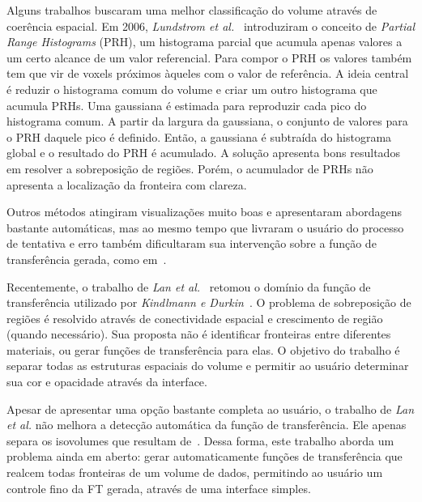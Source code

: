 	Alguns trabalhos buscaram uma melhor classificação do volume através de coerência espacial. Em 2006, \textit{Lundstrom et al.}~\cite{lundstrom1} introduziram o conceito de \textit{Partial Range Histograms} (PRH), um histograma parcial que acumula apenas valores a um certo alcance de um valor referencial. Para compor o PRH os valores também tem que vir de voxels próximos àqueles com o valor de referência. A ideia central é reduzir o histograma comum do volume e criar um outro histograma que acumula PRHs. Uma gaussiana é estimada para reproduzir cada pico do histograma comum. A partir da largura da gaussiana, o conjunto de valores para o PRH daquele pico é definido. Então, a gaussiana é subtraída do histograma global e o resultado do PRH é acumulado. A solução apresenta bons resultados em resolver a sobreposição de regiões. Porém, o acumulador de PRHs não apresenta a localização da fronteira com clareza.
	
	Outros métodos atingiram visualizações muito boas e apresentaram abordagens bastante automáticas, mas ao mesmo tempo que livraram o usuário do processo de tentativa e erro também dificultaram sua intervenção sobre a função de transferência gerada, como em~\cite{ruiz, zhou}.
	
	Recentemente, o trabalho de \textit{Lan et al.}~\cite{lan} retomou o domínio da função de transferência utilizado por \textit{Kindlmann e Durkin}~\cite{gordon}. O problema de sobreposição de regiões é resolvido através de conectividade espacial e crescimento de região (quando necessário). Sua proposta não é identificar fronteiras entre diferentes materiais, ou gerar funções de transferência para elas. O objetivo do trabalho é separar todas as estruturas espaciais do volume e permitir ao usuário determinar sua cor e opacidade através da interface. 
	
	Apesar de apresentar uma opção bastante completa ao usuário, o trabalho de \textit{Lan et al.} não melhora a detecção automática da função de transferência. Ele apenas separa os isovolumes que resultam de~\cite{gordon, kniss1, kniss2}. Dessa forma, este trabalho aborda um problema ainda em aberto: gerar automaticamente funções de transferência que realcem todas fronteiras de um volume de dados, permitindo ao usuário um controle fino da FT gerada, através de uma interface simples.